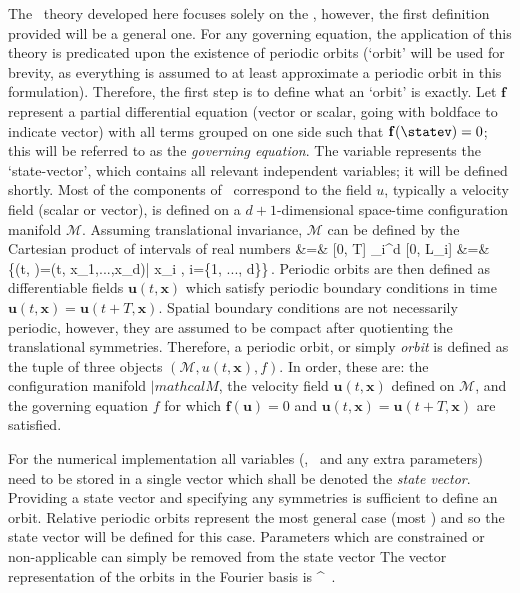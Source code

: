 


The \spt\ theory developed here focuses solely on the \KSe, however, the first definition
provided will be a general one. For any governing equation, the application of this theory is
predicated upon the existence of periodic orbits (`orbit' will be
used for brevity, as everything is assumed to at least approximate a periodic orbit in this formulation).
Therefore, the first step is to define what an `orbit' is exactly. Let $\mathbf{f}$ represent a partial differential
equation (vector or scalar, going with boldface to indicate vector) with all terms
grouped on one side such that $\mathbf{f}(\statev)=0$; this will
be referred to as the \textit{governing equation}. The variable \statev represents the `state-vector',
which contains all relevant independent variables; it will be defined shortly. Most of the components of \statev\ correspond
to the field $u$, typically a velocity field (scalar or vector), is defined on a $d+1$-dimensional space-time configuration manifold $\mathcal{M}$.
Assuming translational invariance, $\mathcal{M}$ can be defined by the Cartesian product of intervals of real numbers
\bea
{} &=& [0, T] \times \prod_{i}^{d} [0, L_i] \continue
            &=& \{(t, )=(t, x_1,...,x_d)\:|\: x_i \in [0, L_i],\: \forall i=\{1, ..., d\}\}\,.
\eea
Periodic orbits are then defined as differentiable fields $\mathbf{u}(t, \mathbf{x})$ which satisfy
periodic boundary conditions in time $\mathbf{u}(t, \mathbf{x}) = \mathbf{u}(t+T, \mathbf{x})$.
Spatial boundary conditions are not necessarily periodic, however, they are assumed to be compact after
quotienting the translational symmetries.
Therefore, a periodic orbit, or simply \textit{orbit} is
defined as the tuple of three objects $(\mathcal{M}, u(t, \mathbf{x}), f)$. In order, these are: the configuration manifold $|mathcal{M}$,
the velocity field $\mathbf{u}(t, \mathbf{x})$ defined on $\mathcal{M}$, and the governing equation $f$ for which
$\mathbf{f}(\mathbf{u})=0$ and $\mathbf{u}(t, \mathbf{x}) = \mathbf{u}(t+T, \mathbf{x})$ are satisfied.

For the numerical implementation all variables (\utensor, \tile\ and any extra parameters) need to
be stored in a single vector which shall be denoted the \textit{state vector}. Providing a state
vector and specifying any symmetries is sufficient to define an orbit. Relative periodic orbits represent
the most general case (most \cdof) and so the state vector will be defined for this case. Parameters which
are constrained or non-applicable can simply be removed from the state vector 
The vector representation of the orbits  in the Fourier basis is
\beq \label{e-statevector}
\statev \equiv [\utensor, \period{}, \speriod{}, \xshift]^{\top} \,.
\eeq


